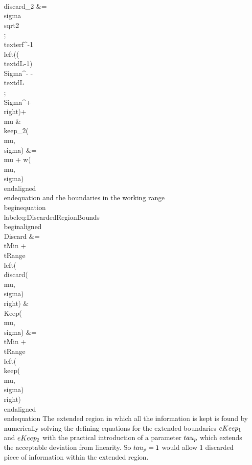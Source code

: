 \\discard_2 &= \\sigma \\sqrt{2} \\; \\text{erf}^{-1}\\left((\\text{dL}-1) \\Sigma^- -\\text{dL} \\; \\Sigma^+ \\right)+\\mu &
\\keep_2(\\mu,\\sigma) &= \\mu + w(\\mu,\\sigma) 
\\end{aligned}
\\end{equation}
and the boundaries in the working range
\\begin{equation}\\label{eq:DiscardedRegionBounds}
\\begin{aligned}
\\Discard &= \\tMin + \\tRange \\left( \\discard(\\mu,\\sigma) \\right) & 
\\Keep(\\mu,\\sigma) &= \\tMin + \\tRange\\left( \\keep(\\mu,\\sigma) \\right) 
\\end{aligned}
\\end{equation}
The extended region in which all the information is kept is found by numerically solving the defining equations for the  extended boundaries $\\eKeep_1$ and $\\eKeep_2$ with the practical introduction of a parameter $ \\tau_{p} $ which extends the acceptable deviation from linearity. So $ \\tau_{p} =1$ would allow 1 discarded piece of information within the extended region.
